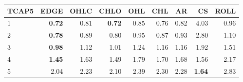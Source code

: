 \begin{table}[ht]
\centering
\begin{tabular}{lrrrrrrrr}
  \hline
TCAP5 & EDGE & OHLC & CHLO & OHL & CHL & AR & CS & ROLL \\ 
  \hline
1 & \textbf{0.72} & 0.81 & \textbf{0.72} & 0.85 & 0.76 & 0.82 & 4.03 & 0.96 \\ 
  2 & \textbf{0.78} & 0.89 & 0.80 & 0.95 & 0.87 & 0.93 & 2.80 & 1.10 \\ 
  3 & \textbf{0.98} & 1.12 & 1.01 & 1.24 & 1.16 & 1.16 & 1.92 & 1.51 \\ 
  4 & \textbf{1.45} & 1.63 & 1.49 & 1.79 & 1.70 & 1.68 & 1.56 & 2.17 \\ 
  5 & 2.04 & 2.23 & 2.10 & 2.39 & 2.30 & 2.28 & \textbf{1.64} & 2.83 \\ 
   \hline
\end{tabular}
\end{table}
